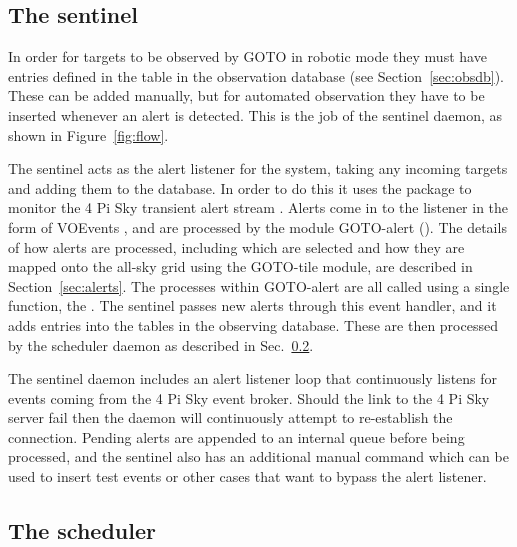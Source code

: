 \begin{colsection}

\subsection{The sentinel}
\label{sec:sentinel}
\begin{colsection}

In order for targets to be observed by GOTO in robotic mode they must have entries defined in the  table in the observation database (see Section~\ref{sec:obsdb}). These can be added manually, but for automated observation they have to be inserted whenever an alert is detected. This is the job of the sentinel daemon, as shown in Figure~\ref{fig:flow}.

The sentinel acts as the alert listener for the system, taking any incoming targets and adding them to the database. In order to do this it uses the   package to monitor the 4 Pi Sky transient alert stream \citep{4pisky}. Alerts come in to the listener in the form of VOEvents \citep{voevent}, and are processed by the  module GOTO-alert (). The details of how alerts are processed, including which are selected and how they are mapped onto the all-sky grid using the GOTO-tile module, are described in Section~\ref{sec:alerts}. The processes within GOTO-alert are all called using a single function, the . The sentinel passes new alerts through this event handler, and it adds entries into the tables in the observing database. These are then processed by the scheduler daemon as described in Sec.~\ref{sec:scheduler}.

The sentinel daemon includes an alert listener loop that continuously listens for events coming from the 4 Pi Sky event broker. Should the link to the 4 Pi Sky server fail then the daemon will continuously attempt to re-establish the connection. Pending alerts are appended to an internal queue before being processed, and the sentinel also has an additional manual  command which can be used to insert test events or other cases that want to bypass the alert listener.

\end{colsection}


\subsection{The scheduler}
\label{sec:scheduler}
\begin{colsection}


\end{colsection}
\end{colsection}
